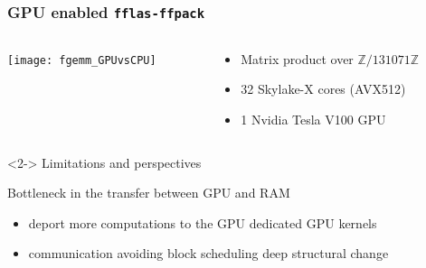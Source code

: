 \documentclass{beamer}
\newcommand{\Z}{\ensuremath{\mathbb{Z}\xspace}}
\newcommand{\thus}{\textcolor{red}{\MVRightarrow{}}\xspace}
\begin{document}

\begin{frame}
  \frametitle{GPU enabled \texttt{fflas-ffpack}}
  \vspace{-1em}
  \begin{columns}
    \begin{column}{.62\textwidth}
      \begin{center}
        \texttt{[image: fgemm\_GPUvsCPU]}
      \end{center}
    \end{column}
    \begin{column}{.38\textwidth}
      \begin{itemize}
      \item Matrix product over $\Z/131071\Z$
      \item 32 Skylake-X cores (AVX512)
      \item 1 Nvidia Tesla V100 GPU
      \end{itemize}    
    \end{column}
  \end{columns}

      \begin{block}<2-> {Limitations and perspectives}
  \vspace{-1em}
        \begin{center}
        \alert{Bottleneck in the transfer between GPU and RAM}
        \end{center}
        \vspace{-1em}
        \begin{itemize}
        \item deport more computations to the GPU \hfill  \thus dedicated GPU kernels
        \item communication avoiding block scheduling \hfill \thus deep structural change
        \end{itemize}
      \end{block}
\end{frame}

\end{document}
